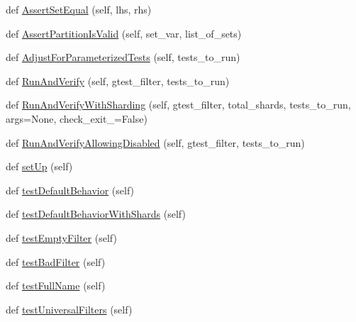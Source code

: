 \begin{DoxyCompactItemize}
\item 
def \hyperlink{classgoogletest-filter-unittest_1_1GTestFilterUnitTest_ace0dfd41efa0dc5c019c1e96e6ce8137}{Assert\+Set\+Equal} (self, lhs, rhs)
\item 
def \hyperlink{classgoogletest-filter-unittest_1_1GTestFilterUnitTest_adcd73eb79d053b0baf4aa600044c4d0e}{Assert\+Partition\+Is\+Valid} (self, set\+\_\+var, list\+\_\+of\+\_\+sets)
\item 
def \hyperlink{classgoogletest-filter-unittest_1_1GTestFilterUnitTest_a34dfc0ab056c19a6644fab9880a49c42}{Adjust\+For\+Parameterized\+Tests} (self, tests\+\_\+to\+\_\+run)
\item 
def \hyperlink{classgoogletest-filter-unittest_1_1GTestFilterUnitTest_af70e720e3178314cb7ffb4268594ef2b}{Run\+And\+Verify} (self, gtest\+\_\+filter, tests\+\_\+to\+\_\+run)
\item 
def \hyperlink{classgoogletest-filter-unittest_1_1GTestFilterUnitTest_a9facb1098281a67776081c772fdd78d5}{Run\+And\+Verify\+With\+Sharding} (self, gtest\+\_\+filter, total\+\_\+shards, tests\+\_\+to\+\_\+run, args=None, check\+\_\+exit\+\_=False)
\item 
def \hyperlink{classgoogletest-filter-unittest_1_1GTestFilterUnitTest_ad4202582f4fbc27a7e4ff9e751b1046f}{Run\+And\+Verify\+Allowing\+Disabled} (self, gtest\+\_\+filter, tests\+\_\+to\+\_\+run)
\item 
def \hyperlink{classgoogletest-filter-unittest_1_1GTestFilterUnitTest_a5aedf9d24243167acee87c9ddba82cc7}{set\+Up} (self)
\item 
def \hyperlink{classgoogletest-filter-unittest_1_1GTestFilterUnitTest_aeef08240778b82270e432ce3ab1186eb}{test\+Default\+Behavior} (self)
\item 
def \hyperlink{classgoogletest-filter-unittest_1_1GTestFilterUnitTest_a5bde3274cf0a76dc6914a4781d8b6429}{test\+Default\+Behavior\+With\+Shards} (self)
\item 
def \hyperlink{classgoogletest-filter-unittest_1_1GTestFilterUnitTest_aeaa447047f82973a4ef02e20d5cb2d19}{test\+Empty\+Filter} (self)
\item 
def \hyperlink{classgoogletest-filter-unittest_1_1GTestFilterUnitTest_a06eb05518484509b13dc139aafd610ce}{test\+Bad\+Filter} (self)
\item 
def \hyperlink{classgoogletest-filter-unittest_1_1GTestFilterUnitTest_a2fb67be78a3c92dcbae64479b220fe0f}{test\+Full\+Name} (self)
\item 
def \hyperlink{classgoogletest-filter-unittest_1_1GTestFilterUnitTest_a6b3267ec5eb1a4d335d2f969d28329dd}{test\+Universal\+Filters} (self)

\end{DoxyCompactItemize}
